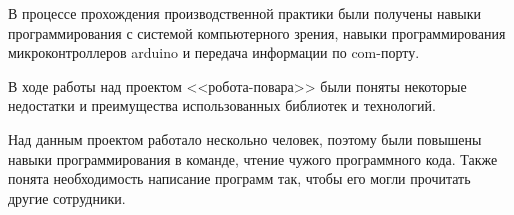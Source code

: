 В процессе прохождения производственной практики были получены навыки программирования с системой компьютерного зрения, навыки программирования микроконтроллеров arduino и передача информации по com-порту.

В ходе работы над проектом <<робота-повара>> были поняты некоторые недостатки и преимущества использованных библиотек и технологий.

Над данным проектом работало нескольно человек, поэтому были повышены навыки программирования в команде, чтение чужого программного кода. Также понята необходимость написание программ так, чтобы его могли прочитать другие сотрудники.
